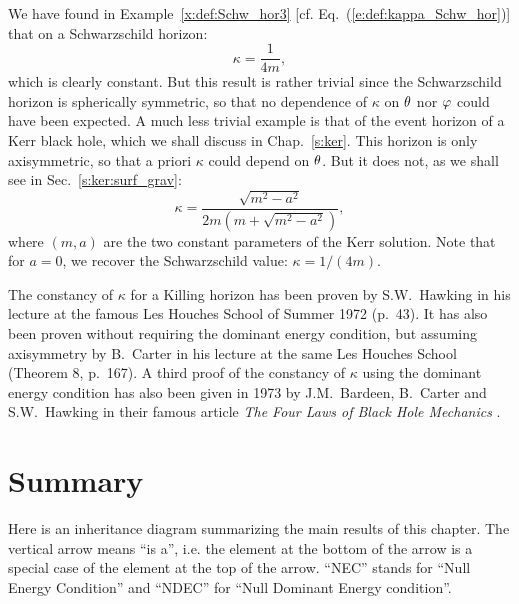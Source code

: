 {{\begin{example}
We have found in Example~\ref{x:def:Schw_hor3} [cf. Eq.~(\ref{e:def:kappa_Schw_hor})]
that on a Schwarzschild horizon:
\[
  \kappa = \frac{1}{4m},
\]
which is clearly constant. But
this result is rather trivial since the Schwarzschild horizon is spherically
symmetric, so that no dependence of $\kappa$ on $\theta$ nor $\varphi$ could have been expected.
A much less trivial example is that of the event horizon of a Kerr black hole,
which we shall discuss in Chap.~\ref{s:ker}. This horizon is only axisymmetric,
so that a priori $\kappa$ could depend on $\theta$. But it does not, as we shall
see in Sec.~\ref{s:ker:surf_grav}:
\[
    \kappa = \frac{\sqrt{m^2 - a^2}}{2m(m + \sqrt{m^2-a^2})} ,
\]
where $(m,a)$ are the two constant parameters of the Kerr solution. Note that for $a=0$,
we recover the Schwarzschild value: $\kappa= 1/(4m)$.
\end{example}

\begin{hist}
The constancy of $\kappa$ for a Killing horizon has been proven by S.W.~Hawking
in his lecture at the famous Les Houches School of Summer 1972 \cite{Hawki73} (p.~43).
It has also been proven without requiring the dominant energy condition, but
assuming axisymmetry by B.~Carter in his lecture at the same Les Houches School
\cite{Carte73b} (Theorem 8, p.~167).
A third proof of the constancy of $\kappa$ using the dominant energy condition
has also been given in 1973 by J.M.~Bardeen, B.~Carter and S.W.~Hawking
in their famous article \emph{The Four Laws of Black Hole Mechanics}
\cite{BardeCH73}.
\end{hist}


\section{Summary}

Here is an inheritance diagram summarizing the main results of this chapter.
The vertical arrow means ``is a'', i.e. the element at the bottom of the arrow
is a special case of the element at the top of the arrow.
``NEC'' stands for ``Null Energy Condition''
and ``NDEC'' for ``Null Dominant Energy condition''.

\begin{center}


\end{center}}}
